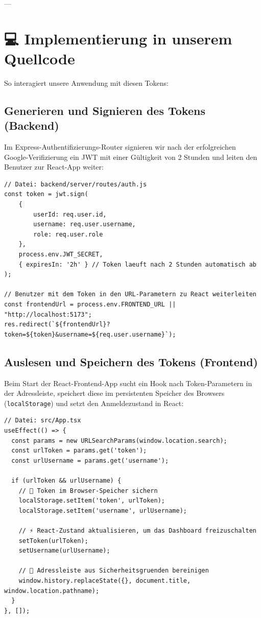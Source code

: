\documentclass[11pt,a4paper]{article}
\begin{document}
---

\section{💻 Implementierung in unserem Quellcode}

So interagiert unsere Anwendung mit diesen Tokens:

\subsection{Generieren und Signieren des Tokens (Backend)}
Im Express-Authentifizierungs-Router signieren wir nach der erfolgreichen Google-Verifizierung ein JWT mit einer Gültigkeit von 2 Stunden und leiten den Benutzer zur React-App weiter:
\begin{lstlisting}
// Datei: backend/server/routes/auth.js
const token = jwt.sign(
    { 
        userId: req.user.id, 
        username: req.user.username, 
        role: req.user.role 
    },
    process.env.JWT_SECRET,
    { expiresIn: '2h' } // Token laeuft nach 2 Stunden automatisch ab
);

// Benutzer mit dem Token in den URL-Parametern zu React weiterleiten
const frontendUrl = process.env.FRONTEND_URL || "http://localhost:5173";
res.redirect(`${frontendUrl}?token=${token}&username=${req.user.username}`);
\end{lstlisting}

\subsection{Auslesen und Speichern des Tokens (Frontend)}
Beim Start der React-Frontend-App sucht ein Hook nach Token-Parametern in der Adressleiste, speichert diese im persistenten Speicher des Browsers (\texttt{localStorage}) und setzt den Anmeldezustand in React:
\begin{lstlisting}
// Datei: src/App.tsx
useEffect(() => {
  const params = new URLSearchParams(window.location.search);
  const urlToken = params.get('token');
  const urlUsername = params.get('username');

  if (urlToken && urlUsername) {
    // 💾 Token im Browser-Speicher sichern
    localStorage.setItem('token', urlToken);
    localStorage.setItem('username', urlUsername);
    
    // ⚡ React-Zustand aktualisieren, um das Dashboard freizuschalten
    setToken(urlToken);
    setUsername(urlUsername);

    // 🧹 Adressleiste aus Sicherheitsgruenden bereinigen
    window.history.replaceState({}, document.title, window.location.pathname);
  }
}, []);
\end{lstlisting}
\end{document}
